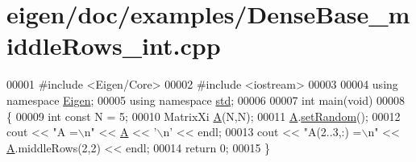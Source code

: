 \hypertarget{eigen_2doc_2examples_2_dense_base__middle_rows__int_8cpp_source}{}\section{eigen/doc/examples/\+Dense\+Base\+\_\+middle\+Rows\+\_\+int.cpp}
\label{eigen_2doc_2examples_2_dense_base__middle_rows__int_8cpp_source}

\begin{DoxyCode}
00001 \textcolor{preprocessor}{#include <Eigen/Core>}
00002 \textcolor{preprocessor}{#include <iostream>}
00003 
00004 \textcolor{keyword}{using namespace }\hyperlink{namespace_eigen}{Eigen};
00005 \textcolor{keyword}{using namespace }\hyperlink{namespacestd}{std};
00006 
00007 \textcolor{keywordtype}{int} main(\textcolor{keywordtype}{void})
00008 \{
00009     \textcolor{keywordtype}{int} \textcolor{keyword}{const} N = 5;
00010     MatrixXi \hyperlink{group___core___module_class_eigen_1_1_matrix}{A}(N,N);
00011     \hyperlink{group___core___module_class_eigen_1_1_matrix}{A}.\hyperlink{class_eigen_1_1_plain_object_base_af0e576a0e1aefc9ee346de44cc352ba3}{setRandom}();
00012     cout << \textcolor{stringliteral}{"A =\(\backslash\)n"} << \hyperlink{group___core___module_class_eigen_1_1_matrix}{A} << \textcolor{charliteral}{'\(\backslash\)n'} << endl;
00013     cout << \textcolor{stringliteral}{"A(2..3,:) =\(\backslash\)n"} << \hyperlink{group___core___module_class_eigen_1_1_matrix}{A}.middleRows(2,2) << endl;
00014     \textcolor{keywordflow}{return} 0;
00015 \}
\end{DoxyCode}
